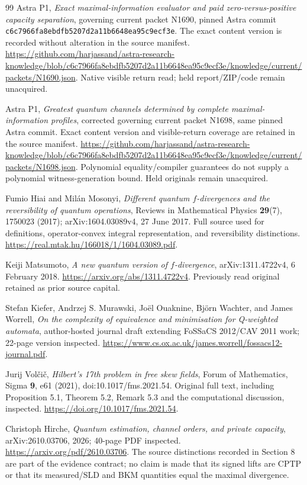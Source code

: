 \documentclass[11pt,a4paper]{article}
\theoremstyle{definition}\newtheorem{definition}[theorem]{Definition}
\begin{document}
\begin{thebibliography}{99}
Astra P1, \emph{Exact maximal-information evaluator and paid zero-versus-positive capacity separation}, governing current packet N1690, pinned Astra commit \texttt{c6c7966fa8ebdfb5207d2a11b6648ea95c9ecf3e}. The exact content version is recorded without alteration in the source manifest. \url{https://github.com/harjassand/astra-research-knowledge/blob/c6c7966fa8ebdfb5207d2a11b6648ea95c9ecf3e/knowledge/current/packets/N1690.json}. Native visible return read; held report/ZIP/code remain unacquired.

Astra P1, \emph{Greatest quantum channels determined by complete maximal-information profiles}, corrected governing current packet N1698, same pinned Astra commit. Exact content version and visible-return coverage are retained in the source manifest. \url{https://github.com/harjassand/astra-research-knowledge/blob/c6c7966fa8ebdfb5207d2a11b6648ea95c9ecf3e/knowledge/current/packets/N1698.json}. Polynomial equality/compiler guarantees do not supply a polynomial witness-generation bound. Held originals remain unacquired.

Fumio Hiai and Mil\'an Mosonyi, \emph{Different quantum $f$-divergences and the reversibility of quantum operations}, Reviews in Mathematical Physics \textbf{29}(7), 1750023 (2017); arXiv:1604.03089v4, 27 June 2017. Full source used for definitions, operator-convex integral representation, and reversibility distinctions. \url{https://real.mtak.hu/166018/1/1604.03089.pdf}.

Keiji Matsumoto, \emph{A new quantum version of $f$-divergence}, arXiv:1311.4722v4, 6 February 2018. \url{https://arxiv.org/abs/1311.4722v4}. Previously read original retained as prior source capital.

Stefan Kiefer, Andrzej S. Murawski, Jo\"el Ouaknine, Bj\"orn Wachter, and James Worrell, \emph{On the complexity of equivalence and minimisation for Q-weighted automata}, author-hosted journal draft extending FoSSaCS 2012/CAV 2011 work; 22-page version inspected. \url{https://www.cs.ox.ac.uk/james.worrell/fossacs12-journal.pdf}.

Jurij Vol\v{c}i\v{c}, \emph{Hilbert's 17th problem in free skew fields}, Forum of Mathematics, Sigma \textbf{9}, e61 (2021), doi:10.1017/fms.2021.54. Original full text, including Proposition 5.1, Theorem 5.2, Remark 5.3 and the computational discussion, inspected. \url{https://doi.org/10.1017/fms.2021.54}.

Christoph Hirche, \emph{Quantum estimation, channel orders, and private capacity}, arXiv:2610.03706, 2026; 40-page PDF inspected. \url{https://arxiv.org/pdf/2610.03706}. The source distinctions recorded in Section 8 are part of the evidence contract; no claim is made that its signed lifts are CPTP or that its measured/SLD and BKM quantities equal the maximal divergence.
\end{thebibliography}
\end{document}
